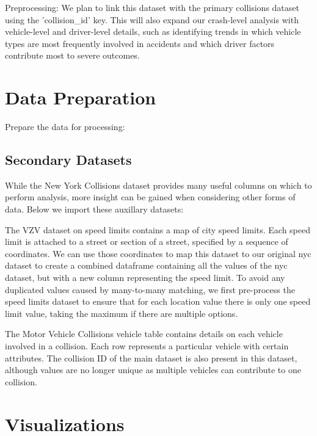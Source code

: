 \documentclass[10pt]{article}\usepackage[]{graphicx}\usepackage[]{xcolor}
\begin{document}
Preprocessing: We plan to link this dataset with the primary collisions dataset using the 'collision\_id' key. This will also expand our crash-level analysis with vehicle-level and driver-level details, such as identifying trends in which vehicle types are most frequently involved in accidents and which driver factors contribute most to severe outcomes.  

\newpage


\section{Data Preparation}

Prepare the data for processing:






\subsection{Secondary Datasets}
While the New York Collisions dataset provides many useful columns on which to perform analysis, more insight can be gained when considering other forms of data. Below we import these auxillary datasets:




The VZV dataset on speed limits contains a map of city speed limits. Each speed limit is attached to a street or section of a street, specified by a sequence of coordinates. We can use those coordinates to map this dataset to our original nyc dataset to create a combined dataframe containing all the values of the nyc dataset, but with a new column representing the speed limit. To avoid any duplicated values caused by many-to-many matching, we first pre-process the speed limits dataset to ensure that for each location value there is only one speed limit value, taking the maximum if there are multiple options. 



The Motor Vehicle Collisions vehicle table contains details on each vehicle involved in a collision. Each row represents a particular vehicle with certain attributes. The collision ID of the main dataset is also present in this dataset, although values are no longer unique as multiple vehicles can contribute to one collision.




\section{Visualizations}
\end{document}

